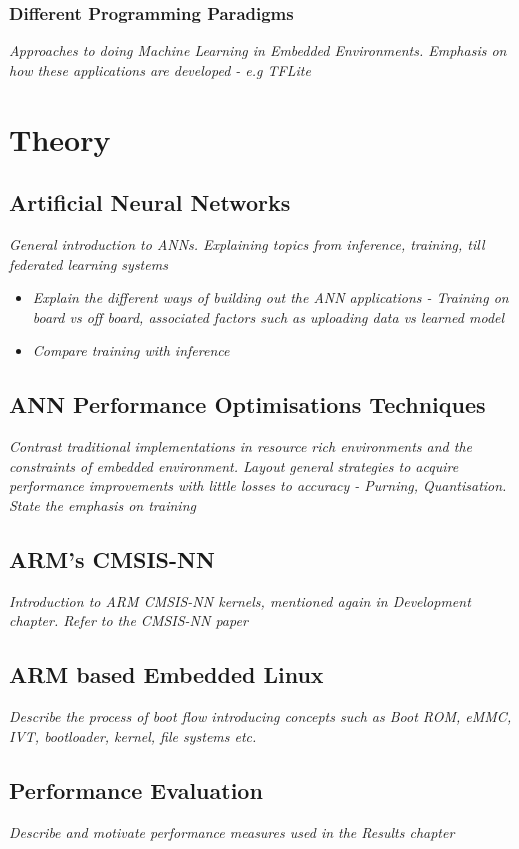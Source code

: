 \subsection{Different Programming Paradigms}
\textit{Approaches to doing Machine Learning in Embedded Environments. Emphasis on how these applications are developed - e.g TFLite}

\chapter{Theory}

\section[Artificial Neural Network (ANN)]{Artificial Neural Networks}
\textit{General introduction to ANNs. Explaining topics from inference, training, till federated learning systems}

\begin{itemize}
	\item \textit{Explain the different ways of building out the ANN applications - Training on board vs off board, associated factors such as uploading data vs learned model}
	\item \textit{Compare training with inference}
\end{itemize}

\section{ANN Performance Optimisations Techniques}
\textit{Contrast traditional implementations in resource rich environments and the constraints of embedded environment. Layout general strategies to acquire performance improvements with little losses to accuracy - Purning, Quantisation. State the emphasis on training}

\section{ARM's CMSIS-NN}
\textit{Introduction to ARM CMSIS-NN kernels, mentioned again in Development chapter. Refer to the CMSIS-NN paper}

\section{ARM based Embedded Linux}
\textit{Describe the process of boot flow introducing concepts such as Boot ROM, eMMC, IVT, bootloader, kernel, file systems etc.}

\section{Performance Evaluation}
\textit{Describe and motivate performance measures used in the Results chapter}
